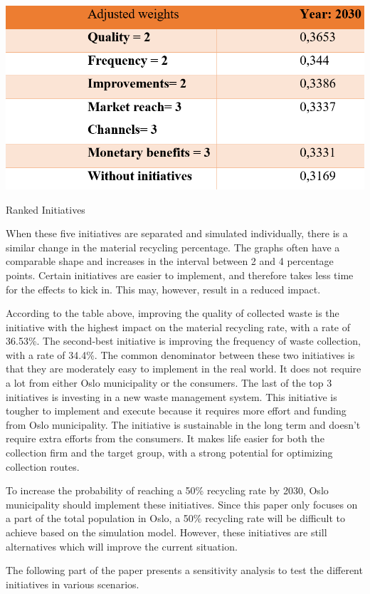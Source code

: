 \begin{table}[H]
\centering
\includegraphics [scale=0.28,angle=360]{tables/rankedinitiatives.png}
\caption{Ranked Initiatives}
\label{tbl:rrankedinitiatives}
\end{table}

\indent \newline
When these five initiatives are separated and simulated individually, there is a similar change in the material recycling percentage. The graphs often have a comparable shape and increases in the interval between 2 and 4 percentage points. Certain initiatives are easier to implement, and therefore takes less time for the effects to kick in. This may, however, result in a reduced impact.

\indent \newline
According to the table above, improving the quality of collected waste is the initiative with the highest impact on the material recycling rate, with a rate of 36.53\%. The second-best initiative is improving the frequency of waste collection, with a rate of 34.4\%. The common denominator between these two initiatives is that they are moderately easy to implement in the real world. It does not require a lot from either Oslo municipality or the consumers. The last of the top 3 initiatives is investing in a new waste management system. This initiative is tougher to implement and execute because it requires more effort and funding from Oslo municipality. The initiative is sustainable in the long term and doesn't require extra efforts from the consumers. It makes life easier for both the collection firm and the target group, with a strong potential for optimizing collection routes. 

\indent \newline
To increase the probability of reaching a 50\% recycling rate by 2030, Oslo municipality should implement these initiatives. Since this paper only focuses on a part of the total population in Oslo, a 50\% recycling rate will be difficult to achieve based on the simulation model. However, these initiatives are still alternatives which will improve the current situation.

\indent \newline
The following part of the paper presents a sensitivity analysis to test the different initiatives in various scenarios.  

